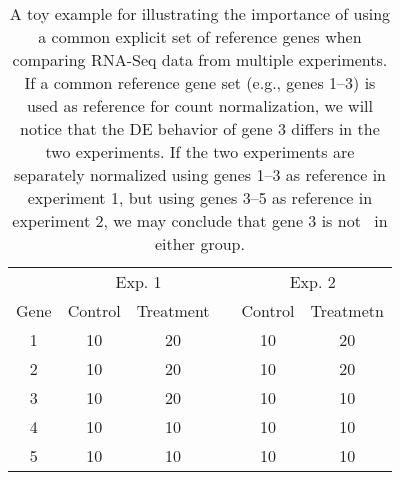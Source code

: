 			
			\begin{center}
				\begin{table}\centering
					\caption[A toy example for illustrating the importance of using a
					common explicit set of reference genes when comparing RNA-Seq data from
					multiple experiments]{A toy example for illustrating the importance of using a
						common explicit set of reference genes when comparing RNA-Seq data from
						multiple experiments. If a common reference gene set (e.g., genes
						1--3) is used as reference for count normalization, we will notice
						that the DE behavior of gene 3 differs in the two experiments. If the
						two experiments are separately normalized using genes 1--3 as
						reference in experiment 1, but using genes 3--5 as reference in
						experiment 2, we may conclude that gene 3 is not \DED~in either group.
					}\label{table:reference}
					\begin{tabular}{cccccc} \hline
						&  \multicolumn{2}{c}{Exp. 1} & & \multicolumn{2}{c}{Exp. 2} \\
						\cline{2-3}  \cline{5-6}
						Gene  & Control & Treatment & & Control & Treatmetn \\
						\hline
						1     & 10       & 20    &   & 10    &20   \\
						2     & 10       & 20    &   & 10    &20   \\
						3     & 10       & 20    &   & 10    &10   \\
						4     & 10       & 10    &   & 10    &10   \\ 
						5     & 10       & 10    &   & 10    &10   \\  
						\hline
					\end{tabular}
				\end{table}
			\end{center}
			
			
